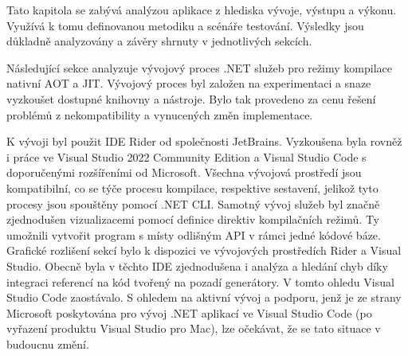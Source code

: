
Tato kapitola se zabývá analýzou aplikace z hlediska vývoje, výstupu a výkonu. Využívá k tomu definovanou metodiku a scénáře testování. Výsledky jsou důkladně analyzovány a závěry shrnuty v jednotlivých sekcích.


Následující sekce analyzuje vývojový proces .NET služeb pro režimy kompilace nativní AOT a JIT. Vývojový proces byl založen na experimentaci a snaze vyzkoušet dostupné knihovny a nástroje. Bylo tak provedeno za cenu řešení problémů z nekompatibility a vynucených změn implementace.



K vývoji byl použit IDE Rider od společnosti JetBrains. Vyzkoušena byla rovněž i práce ve Visual Studio 2022 Community Edition a Visual Studio Code s doporučenými rozšířeními od Microsoft. Všechna vývojová prostředí jsou kompatibilní, co se týče procesu kompilace, respektive sestavení, jelikož tyto procesy jsou spouštěny pomocí .NET CLI. Samotný vývoj služeb byl značně zjednodušen vizualizacemi pomocí definice direktiv kompilačních režimů. Ty umožnili vytvořit program s místy odlišným API v rámci jedné kódové báze. Grafické rozlišení sekcí bylo k dispozici ve vývojových prostředích Rider a Visual Studio. Obecně byla v těchto IDE zjednodušena i analýza a hledání chyb díky integraci referencí na kód tvořený na pozadí generátory. V tomto ohledu Visual Studio Code zaostávalo. S ohledem na aktivní vývoj a podporu, jenž je ze strany Microsoft poskytována pro vývoj .NET aplikací ve Visual Studio Code (po vyřazení produktu Visual Studio pro Mac), lze očekávat, že se tato situace v budoucnu změní.



